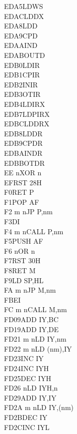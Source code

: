 \begin{multicols}{3}
{\begin{tabbing}
    EDA5\>LDWS\ZXN\\
    EDAC\>LDDX\ZXN\\
    EDA8\>LDD\\
    EDA9\>CPD\\
    EDAA\>IND\\
    EDAB\>OUTD\\
    EDB0\>LDIR\\
    EDB1\>CPIR\\
    EDB2\>INIR\\
    EDB3\>OTIR\\
    EDB4\>LDIRX\ZXN\\
    EDB7\>LDPIRX\ZXN\\
    EDBC\>LDDRX\ZXN\\
    EDB8\>LDDR\\
    EDB9\>CPDR\\
    EDBA\>INDR\\
    EDBB\>OTDR\\
    EE n\>XOR n\\
    EF\>RST 28H\\
    F0\>RET P\\
    F1\>POP AF\\
    F2 m n\>JP P,nm\\
    F3\>DI\\
    F4 m n\>CALL P,nm\\
    F5\>PUSH AF\\
    F6 n\>OR n\\
    F7\>RST 30H\\
    F8\>RET M\\
    F9\>LD SP,HL\\
    FA m n\>JP M,nm\\
    FB\>EI\\
    FC m n\>CALL M,nm\\
    FD09\>ADD IY,BC\\
    FD19\>ADD IY,DE\\
    FD21 m n\>LD IY,nm\\
    FD22 m n\>LD (nm),IY\\
    FD23\>INC IY\\
    FD24\>INC IYH\UNDOC\\
    FD25\>DEC IYH\UNDOC\\
    FD26 n\>LD IYH,n\UNDOC\\
    FD29\>ADD IY,IY\\
    FD2A m n\>LD IY,(nm)\\
    FD2B\>DEC IY\\
    FD2C\>INC IYL\UNDOC\\

\end{tabbing}}
\end{multicols}

